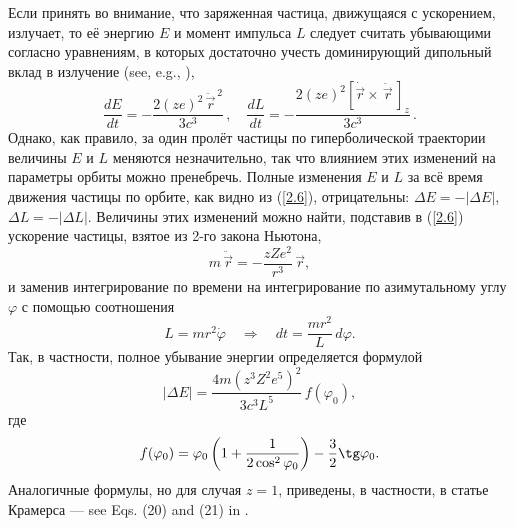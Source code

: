 \documentclass{SovJurn/JETPL}
\begin{document}
Если принять во внимание, что заряженная частица, движущаяся с ускорением, излучает, то её энергию $E$ и момент импульса $L$ следует считать убывающими согласно уравнениям, в которых достаточно учесть доминирующий дипольный вклад в излучение (see, e.g., \cite{landau1975classical}),
\begin{equation}
\label{2.6}
\frac{dE}{dt}=-\frac{2(ze)^2\,{\ddot{\vec r}}^{\,2}}{3c^3}\,,\quad
\frac{dL}{dt}=-\frac{2(ze)^2[\dot{\vec r}\times\, \ddot{\vec r}\,]_z}{3c^3}\,.
\end{equation}
Однако, как правило, за один пролёт частицы по гиперболической траектории величины $E$ и $L$ меняются незначительно, так что влиянием этих изменений на параметры орбиты можно пренебречь. Полные изменения $E$ и $L$ за всё время движения частицы по орбите, как видно из (\ref{2.6}), отрицательны: $\Delta E=-|\Delta E|$, $\Delta L=-|\Delta L|$. Величины этих изменений можно найти, подставив в (\ref{2.6}) ускорение частицы, взятое из 2-го закона Ньютона,
\begin{equation}
\label{2.7}
m\,\ddot{\!\vec r}=-\frac{zZe^2}{r^3}\,\vec r,
\end{equation}
и заменив интегрирование по времени на интегрирование по азимутальному углу $\varphi$ с помощью соотношения
\begin{equation}
\label{2.4}
L=mr^2\dot\varphi
\quad\Rightarrow\quad
dt=\frac{mr^2}{L}\,d\varphi.
\end{equation}
Так, в частности, полное убывание энергии определяется формулой
\begin{equation}
\label{2.9}
|\Delta E|=\frac{4m(z^3Z^2e^5)^2}{3c^3L^5}\,f(\varphi_0),
\end{equation}
где
\begin{equation}
\label{2.9.2}
f(\varphi_0)=\varphi_0\left(1+\frac{1}{2\cos^2\varphi_0}\right)-\frac{3}{2}\tg\varphi_0.
\end{equation}
Аналогичные формулы, но для случая $z=1$, приведены, в частности, в статье Крамерса --- see Eqs. (20) and (21) in \cite{kramers1923xciii}.
\end{document}
